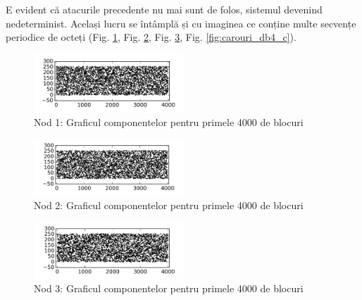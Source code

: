 \documentclass[oneside, 12pt]{book}
\begin{document}
E evident că atacurile precedente nu mai sunt de folos, sistemul devenind nedeterminist. Același lucru se întâmplă și cu imaginea ce conține multe secvențe periodice de octeți (Fig. \ref{fig:carouri_db1_c}, Fig. \ref{fig:carouri_db2_c}, Fig. \ref{fig:carouri_db3_c}, Fig. \ref{fig:carouri_db4_c}).

\begin{figure}[b!]
\begin{center}
\includegraphics[width=0.5\textwidth]{img/carouri_db1_c.png}    %
\caption{Nod 1: Graficul componentelor pentru primele 4000 de blocuri} 
\label{fig:carouri_db1_c}
\end{center}
\end{figure}

\begin{figure}[h]
\begin{center}
\includegraphics[width=0.5\textwidth]{img/carouri_db2_c.png}    %
\caption{Nod 2: Graficul componentelor pentru primele 4000 de blocuri} 
\label{fig:carouri_db2_c}
\end{center}
\end{figure}

\begin{figure}[h]
\begin{center}
\includegraphics[width=0.5\textwidth]{img/carouri_db3_c.png}    %
\caption{Nod 3: Graficul componentelor pentru primele 4000 de blocuri} 
\label{fig:carouri_db3_c}
\end{center}
\end{figure}
\end{document}

